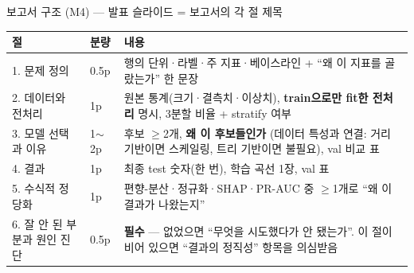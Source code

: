 \begin{frame}{보고서 구조 (M4) --- 발표 슬라이드 = 보고서의 각 절 제목}
  \small
  \begin{tabular}{@{}llp{7.6cm}@{}}
    \toprule
    절 & 분량 & 내용 \\
    \midrule
    1. 문제 정의 & 0.5p & 행의 단위·라벨·주 지표·베이스라인
       + ``왜 이 지표를 골랐는가'' 한 문장 \\
    2. 데이터와 전처리 & 1p & 원본 통계(크기·결측치·이상치),
       \textbf{train으로만 fit한 전처리} 명시, 3분할 비율 +
       stratify 여부 \\
    3. 모델 선택과 이유 & 1$\sim$2p & 후보 $\geq$2개, \textbf{왜
       이 후보들인가} (데이터 특성과 연결: 거리 기반이면
       스케일링, 트리 기반이면 불필요), val 비교 표 \\
    4. 결과 & 1p & 최종 test 숫자(한 번), 학습 곡선 1장, val 표 \\
    5. 수식적 정당화 & 1p & 편향-분산·정규화·SHAP·PR-AUC 중
       $\geq$1개로 ``왜 이 결과가 나왔는지'' \\
    6. 잘 안 된 부분과 원인 진단 & 0.5p & \textbf{필수} --- 없었으면
       ``무엇을 시도했다가 안 됐는가''. 이 절이 비어 있으면
       ``결과의 정직성'' 항목을 의심받음 \\
    \bottomrule
  \end{tabular}
\end{frame}
